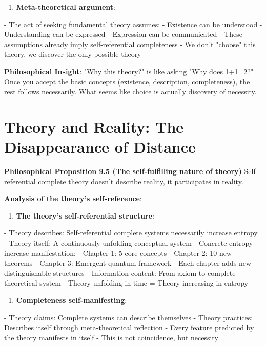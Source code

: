 \begin{enumerate}
\item \textbf{Meta-theoretical argument}:
\end{enumerate}
   - The act of seeking fundamental theory assumes:
     - Existence can be understood
     - Understanding can be expressed
     - Expression can be communicated
   - These assumptions already imply self-referential completeness
   - We don't "choose" this theory, we discover the only possible theory

\textbf{Philosophical Insight}:
"Why this theory?" is like asking "Why does 1+1=2?"
Once you accept the basic concepts (existence, description, completeness),
the rest follows necessarily. What seems like choice is actually discovery of necessity.

\section{Theory and Reality: The Disappearance of Distance}
\label{sec:ch09_philosophy:theory-and-reality-the-disappearance-of-distance}

\textbf{Philosophical Proposition 9.5 (The self-fulfilling nature of theory)}
Self-referential complete theory doesn't describe reality, it participates in reality.

\textbf{Analysis of the theory's self-reference}:

\begin{enumerate}
\item \textbf{The theory's self-referential structure}:
\end{enumerate}
   - Theory describes: Self-referential complete systems necessarily increase entropy
   - Theory itself: A continuously unfolding conceptual system
   - Concrete entropy increase manifestation:
     - Chapter 1: 5 core concepts
     - Chapter 2: 10 new theorems
     - Chapter 3: Emergent quantum framework
     - Each chapter adds new distinguishable structures
   - Information content: From axiom to complete theoretical system
   - Theory unfolding in time = Theory increasing in entropy

\begin{enumerate}
\item \textbf{Completeness self-manifesting}:
\end{enumerate}
   - Theory claims: Complete systems can describe themselves
   - Theory practices: Describes itself through meta-theoretical reflection
   - Every feature predicted by the theory manifests in itself
   - This is not coincidence, but necessity

